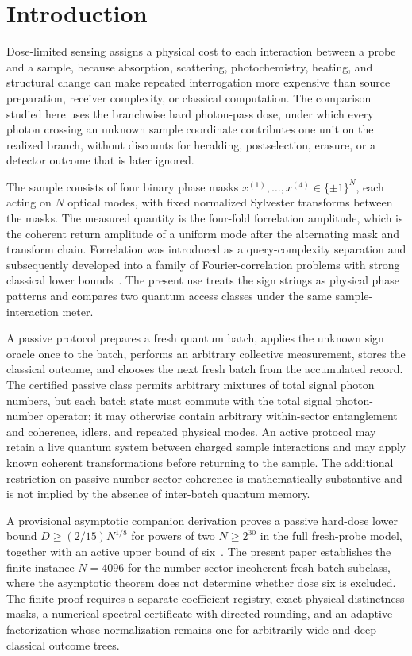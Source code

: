 \section{Introduction}
\label{sec:introduction}

Dose-limited sensing assigns a physical cost to each interaction between a probe and a sample, because absorption, scattering, photochemistry, heating, and structural change can make repeated interrogation more expensive than source preparation, receiver complexity, or classical computation. The comparison studied here uses the branchwise hard photon-pass dose, under which every photon crossing an unknown sample coordinate contributes one unit on the realized branch, without discounts for heralding, postselection, erasure, or a detector outcome that is later ignored.

The sample consists of four binary phase masks $x^{(1)},\ldots,x^{(4)}\in\{\pm1\}^N$, each acting on $N$ optical modes, with fixed normalized Sylvester transforms between the masks. The measured quantity is the four-fold forrelation amplitude, which is the coherent return amplitude of a uniform mode after the alternating mask and transform chain. Forrelation was introduced as a query-complexity separation and subsequently developed into a family of Fourier-correlation problems with strong classical lower bounds~\cite{AaronsonAmbainis2015,BansalSinha2021}. The present use treats the sign strings as physical phase patterns and compares two quantum access classes under the same sample-interaction meter.

A passive protocol prepares a fresh quantum batch, applies the unknown sign oracle once to the batch, performs an arbitrary collective measurement, stores the classical outcome, and chooses the next fresh batch from the accumulated record. The certified passive class permits arbitrary mixtures of total signal photon numbers, but each batch state must commute with the total signal photon-number operator; it may otherwise contain arbitrary within-sector entanglement and coherence, idlers, and repeated physical modes. An active protocol may retain a live quantum system between charged sample interactions and may apply known coherent transformations before returning to the sample. The additional restriction on passive number-sector coherence is mathematically substantive and is not implied by the absence of inter-batch quantum memory.

A provisional asymptotic companion derivation proves a passive hard-dose lower bound $D\ge (2/15)N^{1/8}$ for powers of two $N\ge 2^{30}$ in the full fresh-probe model, together with an active upper bound of six~\cite{SafaviNaeini2026}. The present paper establishes the finite instance $N=4096$ for the number-sector-incoherent fresh-batch subclass, where the asymptotic theorem does not determine whether dose six is excluded. The finite proof requires a separate coefficient registry, exact physical distinctness masks, a numerical spectral certificate with directed rounding, and an adaptive factorization whose normalization remains one for arbitrarily wide and deep classical outcome trees.

